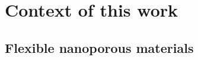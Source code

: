 \documentclass[thesis]{subfiles}
\begin{document}
\chapter{Context of this work}
\startcontents[chapters]
\printpartialtoc

\section{Flexible nanoporous materials}


%

\end{document}
